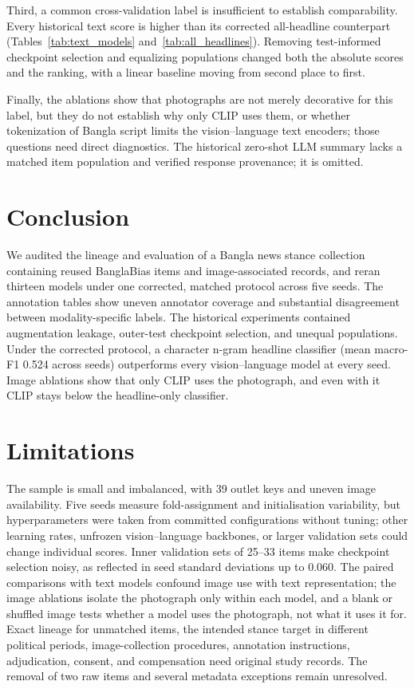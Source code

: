 \documentclass[11pt]{article}
\begin{document}
Third, a common cross-validation label is insufficient to establish comparability. Every historical text score is higher than its corrected all-headline counterpart (Tables~\ref{tab:text_models} and~\ref{tab:all_headlines}). Removing test-informed checkpoint selection and equalizing populations changed both the absolute scores and the ranking, with a linear baseline moving from second place to first.

Finally, the ablations show that photographs are not merely decorative for this label, but they do not establish why only CLIP uses them, or whether tokenization of Bangla script limits the vision--language text encoders; those questions need direct diagnostics. The historical zero-shot LLM summary lacks a matched item population and verified response provenance; it is omitted.

\section{Conclusion}
We audited the lineage and evaluation of a Bangla news stance collection containing reused BanglaBias items and image-associated records, and reran thirteen models under one corrected, matched protocol across five seeds. The annotation tables show uneven annotator coverage and substantial disagreement between modality-specific labels. The historical experiments contained augmentation leakage, outer-test checkpoint selection, and unequal populations. Under the corrected protocol, a character n-gram headline classifier (mean macro-F1 0.524 across seeds) outperforms every vision--language model at every seed. Image ablations show that only CLIP uses the photograph, and even with it CLIP stays below the headline-only classifier.

\section*{Limitations}
The sample is small and imbalanced, with 39 outlet keys and uneven image availability. Five seeds measure fold-assignment and initialisation variability, but hyperparameters were taken from committed configurations without tuning; other learning rates, unfrozen vision--language backbones, or larger validation sets could change individual scores. Inner validation sets of 25--33 items make checkpoint selection noisy, as reflected in seed standard deviations up to 0.060. The paired comparisons with text models confound image use with text representation; the image ablations isolate the photograph only within each model, and a blank or shuffled image tests whether a model uses the photograph, not what it uses it for. Exact lineage for unmatched items, the intended stance target in different political periods, image-collection procedures, annotation instructions, adjudication, consent, and compensation need original study records. The removal of two raw items and several metadata exceptions remain unresolved.
\end{document}
